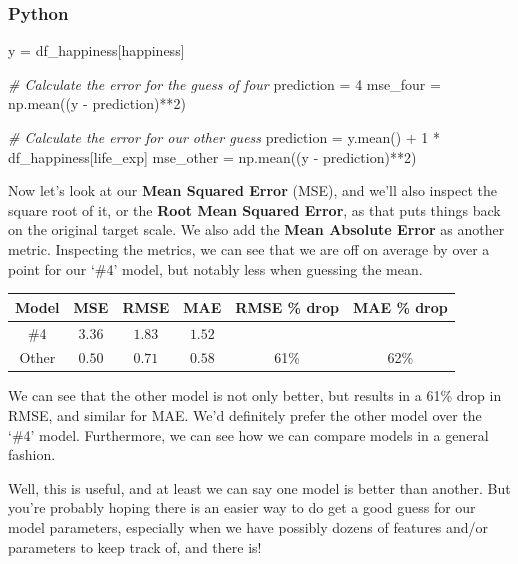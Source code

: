\documentclass[
  letterpaper,
]{krantz}
\newenvironment{Shaded}{}{}
\newcommand{\CommentTok}[1]{\textcolor[rgb]{0.38,0.63,0.69}{\textit{#1}}}
\newcommand{\DecValTok}[1]{\textcolor[rgb]{0.25,0.63,0.44}{#1}}
\newcommand{\NormalTok}[1]{#1}
\newcommand{\OperatorTok}[1]{\textcolor[rgb]{0.40,0.40,0.40}{#1}}
\newcommand{\StringTok}[1]{\textcolor[rgb]{0.25,0.44,0.63}{#1}}
\begin{document}
\subsubsection{Python}

\begin{Shaded}
\begin{Highlighting}[]
\NormalTok{y }\OperatorTok{=}\NormalTok{ df\_happiness[}\StringTok{\textquotesingle{}happiness\textquotesingle{}}\NormalTok{]}

\CommentTok{\# Calculate the error for the guess of four}
\NormalTok{prediction }\OperatorTok{=} \DecValTok{4}
\NormalTok{mse\_four   }\OperatorTok{=}\NormalTok{ np.mean((y }\OperatorTok{{-}}\NormalTok{ prediction)}\OperatorTok{**}\DecValTok{2}\NormalTok{)}

\CommentTok{\# Calculate the error for our other guess}
\NormalTok{prediction }\OperatorTok{=}\NormalTok{ y.mean() }\OperatorTok{+} \DecValTok{1} \OperatorTok{*}\NormalTok{ df\_happiness[}\StringTok{\textquotesingle{}life\_exp\textquotesingle{}}\NormalTok{]}
\NormalTok{mse\_other  }\OperatorTok{=}\NormalTok{ np.mean((y }\OperatorTok{{-}}\NormalTok{ prediction)}\OperatorTok{**}\DecValTok{2}\NormalTok{)}
\end{Highlighting}
\end{Shaded}

Now let's look at our \textbf{Mean Squared Error} (MSE), and we'll also
inspect the square root of it, or the \textbf{Root Mean Squared Error},
as that puts things back on the original target scale. We also add the
\textbf{Mean Absolute Error} as another metric. Inspecting the metrics,
we can see that we are off on average by over a point for our `\#4'
model, but notably less when guessing the mean.

\begin{longtable*}{cccccc}
\toprule
Model & MSE & RMSE & MAE & RMSE \% drop & MAE \% drop \\ 
\midrule
\#4 & $3.36$ & $1.83$ & $1.52$ &  &  \\ 
Other & $0.50$ & $0.71$ & $0.58$ & 61\% & 62\% \\ 
\bottomrule
\end{longtable*}

We can see that the other model is not only better, but results in a
61\% drop in RMSE, and similar for MAE. We'd definitely prefer the other
model over the `\#4' model. Furthermore, we can see how we can compare
models in a general fashion.

Well, this is useful, and at least we can say one model is better than
another. But you're probably hoping there is an easier way to do get a
good guess for our model parameters, especially when we have possibly
dozens of features and/or parameters to keep track of, and there is!
\end{document}
